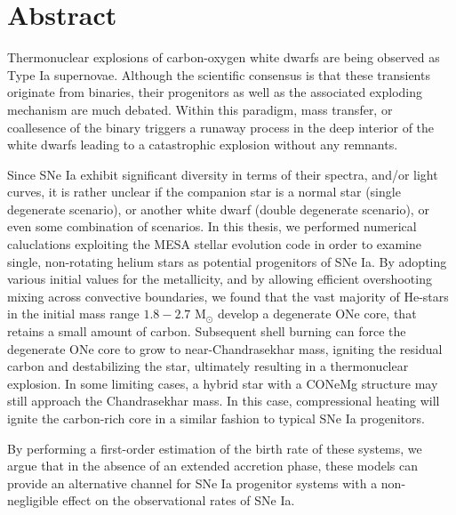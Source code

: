 \documentclass[../main/thesis_msc.tex]{subfiles}
\begin{document}
\chapter*{Abstract}

Thermonuclear explosions of carbon-oxygen white dwarfs are being observed as Type Ia supernovae. Although the scientific consensus is that these transients originate from binaries, their progenitors as well as the associated exploding mechanism are much debated. Within this paradigm, mass transfer, or coallesence of the binary triggers a runaway process in the deep interior of the white dwarfs leading to a catastrophic explosion without any remnants.

Since SNe Ia exhibit significant diversity in terms of their spectra, and/or light curves, it is rather unclear if the companion star is a normal star (single degenerate scenario), or another white dwarf (double degenerate scenario), or even some combination of scenarios. In this thesis, we performed numerical caluclations exploiting the MESA stellar evolution code in order to examine single, non-rotating helium stars as potential progenitors of SNe Ia. By adopting various initial values for the metallicity, and by allowing efficient overshooting mixing across convective boundaries, we found that the vast majority of He-stars in the initial mass range $1.8-2.7$ M$_{\odot}$ develop a degenerate ONe core, that retains a small amount of carbon. Subsequent shell burning can force the degenerate ONe core to grow to near-Chandrasekhar mass, igniting the residual carbon and destabilizing the star, ultimately resulting in a thermonuclear explosion. In some limiting cases, a hybrid star with a CONeMg structure may still approach the Chandrasekhar mass. In this case, compressional heating will ignite the carbon-rich core in a similar fashion to typical SNe Ia progenitors.

By performing a first-order estimation of the birth rate of these systems, we argue that in the absence of an extended accretion phase, these models can provide an alternative channel for SNe Ia progenitor systems with a non-negligible effect on the observational rates of SNe Ia.
\end{document}
